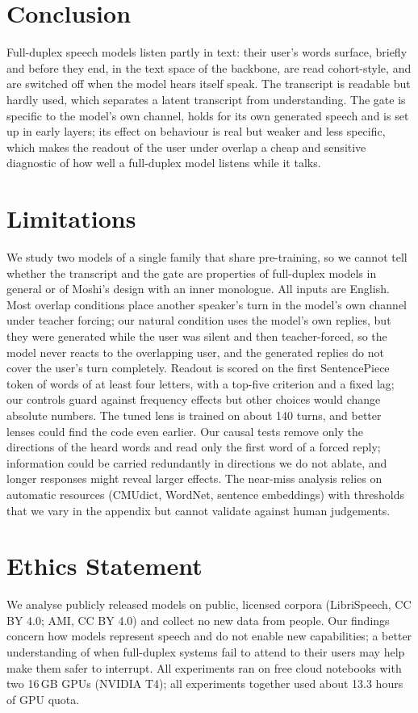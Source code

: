 \documentclass[11pt,a4paper]{article}
\begin{document}
\section{Conclusion}
Full-duplex speech models listen partly in text: their user's words surface, briefly and before they end, in the text space of the backbone, are read cohort-style, and are switched off when the model hears itself speak.
The transcript is readable but hardly used, which separates a latent transcript from understanding.
The gate is specific to the model's own channel, holds for its own generated speech and is set up in early layers; its effect on behaviour is real but weaker and less specific, which makes the readout of the user under overlap a cheap and sensitive diagnostic of how well a full-duplex model listens while it talks.

\section*{Limitations}
We study two models of a single family that share pre-training, so we cannot tell whether the transcript and the gate are properties of full-duplex models in general or of Moshi's design with an inner monologue.
All inputs are English.
Most overlap conditions place another speaker's turn in the model's own channel under teacher forcing; our natural condition uses the model's own replies, but they were generated while the user was silent and then teacher-forced, so the model never reacts to the overlapping user, and the generated replies do not cover the user's turn completely.
Readout is scored on the first SentencePiece token of words of at least four letters, with a top-five criterion and a fixed lag; our controls guard against frequency effects but other choices would change absolute numbers.
The tuned lens is trained on about 140 turns, and better lenses could find the code even earlier.
Our causal tests remove only the directions of the heard words and read only the first word of a forced reply; information could be carried redundantly in directions we do not ablate, and longer responses might reveal larger effects.
The near-miss analysis relies on automatic resources (CMUdict, WordNet, sentence embeddings) with thresholds that we vary in the appendix but cannot validate against human judgements.

\section*{Ethics Statement}
We analyse publicly released models on public, licensed corpora (LibriSpeech, CC BY 4.0; AMI, CC BY 4.0) and collect no new data from people.
Our findings concern how models represent speech and do not enable new capabilities; a better understanding of when full-duplex systems fail to attend to their users may help make them safer to interrupt.
All experiments ran on free cloud notebooks with two 16\,GB GPUs (NVIDIA T4); all experiments together used about 13.3 hours of GPU quota.
\end{document}
